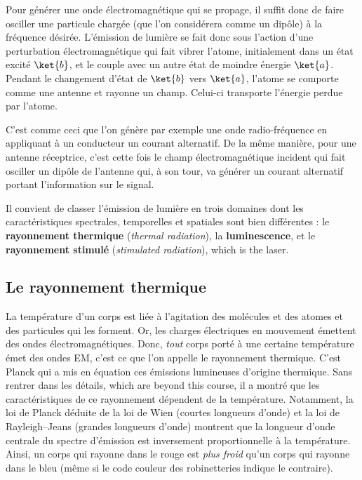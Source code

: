 Pour générer une onde électromagnétique qui se propage, il suffit donc de faire
osciller une particule chargée (que l'on considérera comme un dipôle) à la
fréquence désirée. L'émission de lumière se fait donc sous l'action d'une
perturbation électromagnétique qui fait vibrer l'atome, initialement dans un
état excité $\ket{b}$, et le couple avec un autre état de moindre énergie
$\ket{a}$. Pendant le changement d'état de $\ket{b}$ vers $\ket{a}$, l'atome se
comporte comme une antenne et rayonne un champ. Celui-ci transporte l'énergie
perdue par l'atome.

\begin{example}
  C'est comme ceci que l'on génère par exemple une onde radio-fréquence en
  appliquant à un conducteur un courant alternatif. De la même manière, pour une
  antenne réceptrice, c'est cette fois le champ électromagnétique incident qui
  fait osciller un dipôle de l'antenne qui, à son tour, va générer un courant
  alternatif portant l'information sur le signal.
\end{example}

Il convient de classer l'émission de lumière en trois domaines dont les
caractéristiques spectrales, temporelles et spatiales sont bien différentes :
le \textbf{rayonnement thermique} (\textit{thermal radiation}), la
\textbf{luminescence}, et le \textbf{rayonnement stimulé} (\textit{stimulated
radiation}), which is the laser.

\subsection{Le rayonnement thermique}
La température d'un corps est liée à l'agitation des molécules et des atomes et
des particules qui les forment. Or, les charges électriques en mouvement
émettent des ondes électromagnétiques. Donc, \emph{tout} corps porté à une
certaine température émet des ondes EM, c'est ce que l'on appelle le
rayonnement thermique. C'est Planck qui a mis en équation ces émissions
lumineuses d'origine thermique. Sans rentrer dans les détails, which are beyond
this course, il a montré que les caractéristiques de ce rayonnement dépendent
de la température. Notamment,
la loi de Planck déduite de la loi de Wien (courtes longueurs d'onde) et la loi
de Rayleigh--Jeans (grandes longueurs d'onde) montrent que la longueur d'onde
centrale du spectre d'émission est inversement proportionnelle à la
température. Ainsi, un corps qui rayonne dans le rouge est \emph{plus froid}
qu'un corps qui rayonne dans le bleu (même si le code couleur des robinetteries
indique le contraire).


